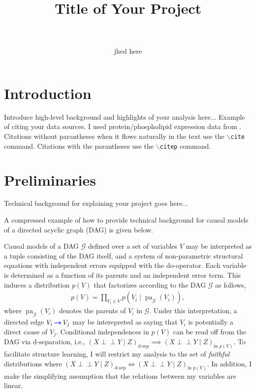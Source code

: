 \documentclass[twoside,11pt]{article}
\DeclareMathOperator{\diedgeright}{\textcolor{blue}{\boldsymbol{\rightarrow}}}
\DeclareMathOperator{\pa}{pa}
\def\ci{\perp\!\!\!\perp}
\newcommand{\G}{\mathcal{G}}
\begin{document}
\title{Title of Your Project
}

\author{
		 \\
       	 \\
      	{jhed here} 
	}


\maketitle

\section{Introduction}
\label{sec:intro}
Introduce high-level background and highlights of your analysis here$\dots$ Example of citing your data sources. I used protein/phospholipid expression data from \cite{sachs2005causal}. Citations without parantheses when it flows naturally in the text use the \texttt{$\backslash$cite} command. Citations with the parantheses use the \texttt{$\backslash$citep} command.


\section{Preliminaries}
\label{sec:prelims}
Technical background for explaining your project goes here$\dots$ 

A compressed example of how to provide technical background for causal models of a directed acyclic graph (DAG) is given below.

Causal models of a DAG $\G$ defined over a set of variables $V$ may be interpreted as a tuple consisting of the DAG itself, and a system of non-parametric structural equations with independent errors equipped with the do-operator. Each variable is determined as a function of its parents and an independent error term. This induces a distribution $p(V)$ that factorizes according to the DAG $\G$ as follows,
%
\begin{align*}
p(V) = \prod_{V_i \in V} p(V_i \mid \pa_\G(V_i)),
\end{align*}
%
where $\pa_\G(V_i)$ denotes the parents of $V_i$ in $\G.$ Under this interpretation, a directed edge $V_i \diedgeright V_j$ may be interepreted as saying that $V_i$ is potentially a direct cause of $V_j$. Conditional independences in $p(V)$ can be read off from the DAG via d-separation, i.e., $(X \ci Y \mid Z)_\text{d-sep} \implies (X \ci Y \mid Z)_{\text{in } p(V)}.$ To facilitate structure learning, I will restrict my analysis to the set of \emph{faithful} distributions where $(X \ci Y \mid Z)_\text{d-sep} \iff (X \ci Y \mid Z)_{\text{in } p(V)}.$ In addition, I make the simplifying assumption that the relations between my variables are linear.
\end{document}
